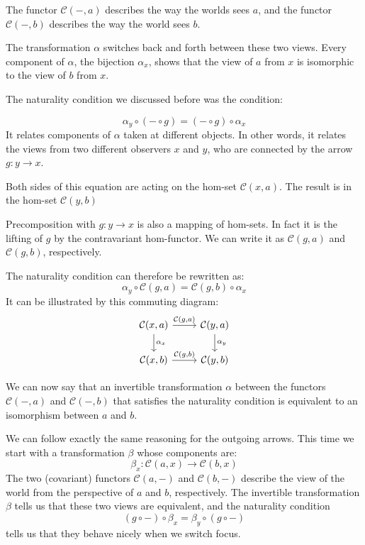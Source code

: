\documentclass[DaoFP]{subfiles}
\begin{document}
The functor $\mathcal{C}(-, a)$ describes the way the worlds sees $a$, and the functor $\mathcal{C}(-, b)$ describes the way the world sees $b$. 

The transformation $\alpha$ switches back and forth between these two views. Every component of $\alpha$, the bijection $\alpha_x$, shows that the view of $a$ from $x$ is isomorphic to the view of $b$ from $x$. 

The naturality condition we discussed before was the condition:

\[ \alpha_y \circ (- \circ g) = (- \circ g) \circ \alpha_x \]
It relates components of $\alpha$ taken at different objects. In other words, it relates the views from two different observers $x$ and $y$, who are connected by the arrow $g \colon y \to x$. 

Both sides of this equation are acting on the hom-set $\mathcal{C}(x, a)$. The result is in the hom-set $\mathcal{C}(y, b)$

Precomposition with $g \colon y \to x$ is also a mapping of hom-sets. In fact it is the lifting of $g$ by the contravariant hom-functor. We can write it as $\mathcal{C}(g, a)$ and $\mathcal{C}(g, b)$, respectively.

The naturality condition can therefore be rewritten as:
\[ \alpha_y \circ \mathcal{C}(g, a) = \mathcal{C}(g, b) \circ \alpha_x \]
It can be illustrated by this commuting diagram:
\[
 \begin{tikzcd}
 \mathcal{C}(x, a)
 \arrow[d, "\alpha_x"]
 \arrow[r, "{\mathcal{C}(g, a)}"]
 &
 \mathcal{C}(y, a)
  \arrow[d, "\alpha_y"]
 \\
 \mathcal{C}(x, b)
 \arrow[r, "{\mathcal{C}(g, b)}"]
& \mathcal{C}(y, b)
 \end{tikzcd}
\]

We can now say that  an invertible transformation $\alpha$ between the functors $\mathcal{C}(-, a)$ and $\mathcal{C}(-, b)$ that satisfies the naturality condition is equivalent to an isomorphism between $a$ and $b$.

We can follow exactly the same reasoning for the outgoing arrows. This time we start with a transformation $\beta$ whose components are:
\[ \beta_x \colon \mathcal{C}(a, x) \to \mathcal{C}(b, x) \]
The two (covariant) functors $\mathcal{C}(a, -)$ and $\mathcal{C}(b, -)$ describe the view of the world from the perspective of $a$ and $b$, respectively. The invertible transformation $\beta$ tells us that these two views are equivalent, and the naturality condition 
\[ (g \circ -) \circ \beta_x = \beta_y \circ (g \circ -) \]
tells us that they behave nicely when we switch focus.
\end{document}
